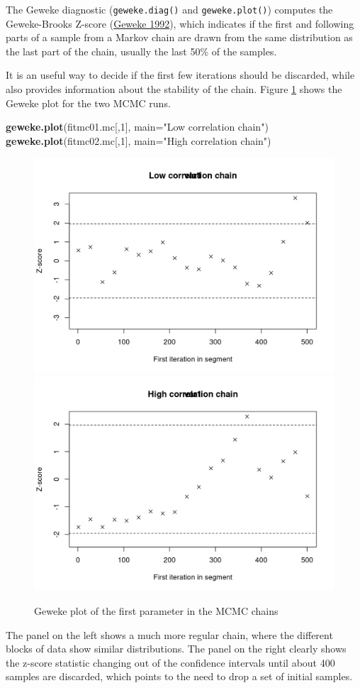 \documentclass[
]{book}
\newenvironment{Shaded}{\begin{snugshade}}{\end{snugshade}}
\newcommand{\AttributeTok}[1]{\textcolor[rgb]{0.13,0.29,0.53}{#1}}
\newcommand{\DecValTok}[1]{\textcolor[rgb]{0.00,0.00,0.81}{#1}}
\newcommand{\FunctionTok}[1]{\textcolor[rgb]{0.13,0.29,0.53}{\textbf{#1}}}
\newcommand{\NormalTok}[1]{#1}
\newcommand{\StringTok}[1]{\textcolor[rgb]{0.31,0.60,0.02}{#1}}
\begin{document}
The Geweke diagnostic (\texttt{geweke.diag()} and \texttt{geweke.plot()}) computes the Geweke-Brooks Z-score (\protect\hyperlink{ref-Geweke1992}{Geweke 1992}), which indicates if the first and following parts of a sample from a Markov chain are drawn from the same distribution as the last part of the chain, usually the last 50\% of the samples.

It is an useful way to decide if the first few iterations should be discarded, while also provides information about the stability of the chain. Figure \ref{fig:gew01} shows the Geweke plot for the two MCMC runs.

\begin{Shaded}
\begin{Highlighting}[]
\FunctionTok{geweke.plot}\NormalTok{(fitmc01.mc[,}\DecValTok{1}\NormalTok{], }\AttributeTok{main=}\StringTok{"Low correlation chain"}\NormalTok{)}
\FunctionTok{geweke.plot}\NormalTok{(fitmc02.mc[,}\DecValTok{1}\NormalTok{], }\AttributeTok{main=}\StringTok{"High correlation chain"}\NormalTok{)}
\end{Highlighting}
\end{Shaded}

\begin{figure}
\includegraphics[width=0.5\linewidth]{_bookdown_files/_main_files/figure-html/gew01-1} \includegraphics[width=0.5\linewidth]{_bookdown_files/_main_files/figure-html/gew01-2} \caption{Geweke plot of the first parameter in the MCMC chains}\label{fig:gew01}
\end{figure}

The panel on the left shows a much more regular chain, where the different blocks of data show similar distributions. The panel on the right clearly shows the z-score statistic changing out of the confidence intervals until about 400 samples are discarded, which points to the need to drop a set of initial samples.
\end{document}
